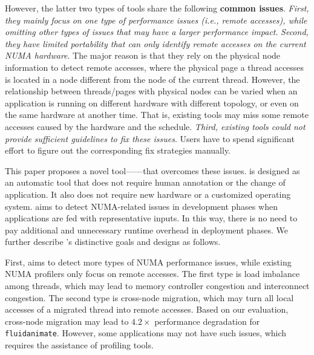 
However, the latter two types of tools share the following \textbf{common issues}. \textit{First, they mainly focus on one type of performance issues (i.e., remote accesses), while omitting other types of issues that may have a larger performance impact}. 
\textit{Second, they have limited portability that can only identify remote accesses on the current NUMA hardware}. The major reason is that they rely on the physical node information to detect remote accesses, where the physical page a thread accesses is located in a node different from the node of the current thread. However, 
the relationship between threads/pages with physical nodes can be varied when an application is running on different hardware with different topology, or even on the same hardware at another time. That is, existing tools may miss some remote accesses caused by the hardware and the schedule. \textit{Third, existing tools could not provide sufficient guidelines to fix these issues}. Users have to spend significant effort to figure out the corresponding fix strategies manually. 


This paper proposes a novel tool---\NP{}---that overcomes these issues. \NP{} is designed as an automatic tool that does not require human annotation or the change of application. It also does not require new hardware or a customized operating system. \NP{} aims to detect NUMA-related issues in development phases when applications are fed with representative inputs. In this way, there is no need to pay additional and unnecessary runtime overhead in deployment phases. We further describe \NP{}'s distinctive goals and designs as follows. 

First, \NP{} aims to detect more types of NUMA performance issues, while existing NUMA profilers  only focus on remote accesses. The first type is load imbalance among threads, which may lead to memory controller congestion and interconnect congestion. The second type is cross-node migration, which may turn all local accesses of a migrated thread into remote accesses. Based on our evaluation, cross-node migration may lead to $4.2\times$ performance degradation for \texttt{fluidanimate}. However, some applications may not have such issues, which requires the assistance of profiling tools.  

